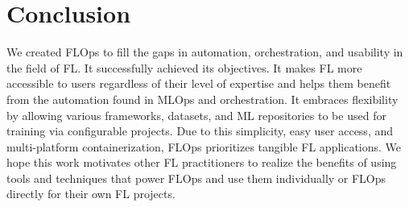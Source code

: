 \chapter{Conclusion}\label{chapter:conclusion}

We created FLOps to fill the gaps in automation, orchestration, and usability in the field of FL.
It successfully achieved its objectives.
It makes FL more accessible to users regardless of their level of expertise and helps them benefit from the automation found in MLOps and orchestration.
It embraces flexibility by allowing various frameworks, datasets, and ML repositories to be used for training via configurable projects.
Due to this simplicity, easy user access, and multi-platform containerization, FLOps prioritizes tangible FL applications.
We hope this work motivates other FL practitioners to realize the benefits of using tools and techniques that power FLOps and use them individually or FLOps directly for their own FL projects.

